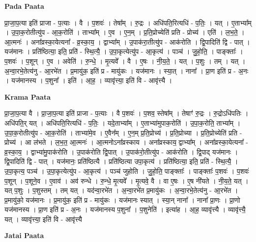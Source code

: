 \documentclass[17pt]{extarticle}
\begin{document}
\textbf{Pada Paata} \newline

प्रा॒जा॒प॒त्या इति॑ प्राजा - प॒त्याः । वै । प॒शवः॑ । तेषा᳚म् । रु॒द्रः । अधि॑पति॒रित्यधि॑ - प॒तिः॒ । यत् । ए॒ताभ्या᳚म् । उ॒पा॒क॒रोतीत्यु॑प - आ॒क॒रोति॑ । ताभ्या᳚म् । ए॒व । ए॒न॒म् । प्र॒ति॒प्रोच्येति॑ प्रति - प्रोच्य॑ । एति॑ । ल॒भ॒ते॒ । आ॒त्मनः॑ । अना᳚व्रस्का॒येत्यना᳚ - व्र॒स्का॒य॒ । द्वाभ्या᳚म् । उ॒पाक॑रा॒तीत्यु॑प - आक॑रोति । द्वि॒पादिति॑ द्वि - पात् । यज॑मानः । प्रति॑ष्ठित्या॒ इति॒ प्रति॑ - स्थि॒त्यै॒ । उ॒पा॒कृत्येत्यु॑प - आ॒कृत्य॑ । पञ्च॑ । जु॒हो॒ति॒ । पाङ्क्ताः᳚ । प॒शवः॑ । प॒शून् । ए॒व । अवेति॑ । रु॒न्धे॒ । मृ॒त्यवे᳚ । वै । ए॒षः । नी॒य॒ते॒ । यत् । प॒शुः । तम् । यत् । अ॒न्वा॒रभे॒तेत्य॑नु - आ॒रभे॑त । प्र॒मायु॑क॒ इति॑ प्र - मायु॑कः । यज॑मानः । स्या॒त् । नाना᳚ । प्रा॒ण इति॑ प्र - अ॒नः । यज॑मानस्य । प॒शुना᳚ । इति॑ । आ॒ह॒ । व्यावृ॑त्त्या॒ इति॑ वि - आवृ॑त्त्यै ।  \newline


\textbf{Krama Paata} \newline

प्रा॒जा॒प॒त्या वै । प्रा॒जा॒प॒त्या इति॑ प्राजा - प॒त्याः । वै प॒शवः॑ । प॒शव॒ स्तेषा᳚म् । तेषाꣳ॑ रु॒द्रः । रु॒द्रोऽधि॑पतिः । अधि॑पति॒र् यत् । अधि॑पति॒रित्यधि॑ - प॒तिः॒ । यदे॒ताभ्या᳚म् । ए॒ताभ्या॑मुपाक॒रोति॑ । उ॒पा॒क॒रोति॒ ताभ्या᳚म् । उ॒पा॒क॒रोतीत्यु॑प - आ॒क॒रोति॑ । ताभ्या॑मे॒व । ए॒वैन᳚म् । ए॒न॒म् प्र॒ति॒प्रोच्य॑ । प्र॒ति॒प्रोच्या । प्र॒ति॒प्रोच्येति॑ प्रति - प्रोच्य॑ । आ ल॑भते । ल॒भ॒त॒ आ॒त्मनः॑ । आ॒त्मनोऽना᳚व्रस्काय । अना᳚व्रस्काय॒ द्वाभ्या᳚म् । अना᳚व्रस्का॒येत्यना᳚ - व्र॒स्का॒य॒ । द्वाभ्या॑मु॒पाक॑रोति । उ॒पाक॑रोति द्वि॒पात् । उ॒पाक॑रो॒तीत्यु॑प - आक॑रोति । द्वि॒पाद् यज॑मानः । द्वि॒पादिति॑ द्वि - पात् । यज॑मानः॒ प्रति॑ष्ठित्यै । प्रति॑ष्ठित्या उपा॒कृत्य॑ । प्रति॑ष्ठित्या॒ इति॒ प्रति॑ - स्थि॒त्यै॒ । उ॒पा॒कृत्य॒ पञ्च॑ । उ॒पा॒कृत्येत्यु॑प - आ॒कृत्य॑ । पञ्च॑ जुहोति । जु॒हो॒ति॒ पाङ्क्ताः᳚ । पाङ्क्ताः᳚ प॒शवः॑ । प॒शवः॑ प॒शून् । प॒शूने॒व । ए॒वाव॑ । अव॑ रुन्धे । रु॒न्धे॒ मृ॒त्यवे᳚ । मृ॒त्यवे॒ वै । वा ए॒षः । ए॒ष नी॑यते । नी॒य॒ते॒ यत् । यत् प॒शुः । प॒शुस्तम् । तम् यत् । यद॑न्वा॒रभे॑त । अ॒न्वा॒रभे॑त प्र॒मायु॑कः । अ॒न्वा॒रभे॒तेत्य॑नु - आ॒रभे॑त । प्र॒मायु॑को॒ यज॑मानः । प्र॒मायु॑क॒ इति॑ प्र - मायु॑कः । यज॑मानः स्यात् । स्या॒न् नाना᳚ । नाना᳚ प्रा॒णः । प्रा॒णो यज॑मानस्य । प्रा॒ण इति॑ प्र - अ॒नः । यज॑मानस्य प॒शुना᳚ । प॒शुनेति॑ । इत्या॑ह । आ॒ह॒ व्यावृ॑त्त्यै । व्यावृ॑त्त्यै॒ यत् । व्यावृ॑त्त्या॒ इति॑ वि - आवृ॑त्त्यै \newline

\textbf{Jatai Paata} \newline
\end{document}
